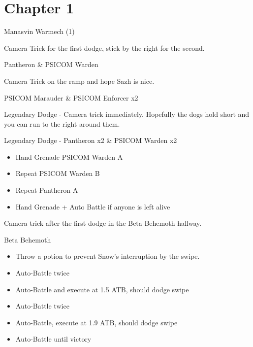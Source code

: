 \chapter{Chapter 1}
	\begin{battle}[1:06]{Manasvin Warmech (1)}
	\end{battle}

	Camera Trick for the first dodge, stick by the right for the second.

	\begin{battle}[0:16]{Pantheron \& PSICOM Warden}
	\end{battle}

	Camera Trick on the ramp and hope Sazh is nice.

	\begin{battle}[0:39]{PSICOM Marauder \& PSICOM Enforcer x2}
	\end{battle}

	Legendary Dodge - Camera trick immediately. Hopefully the dogs hold short and you can run to the right around them.

	\begin{battle}[0:18]{Legendary Dodge - Pantheron x2 \& PSICOM Warden x2}
		\begin{itemize}
			\item Hand Grenade PSICOM Warden A
			\item Repeat PSICOM Warden B
			\item Repeat Pantheron A
			\item Hand Grenade + Auto Battle if anyone is left alive
		\end{itemize}

	\end{battle}

	Camera trick after the first dodge in the Beta Behemoth hallway.

	\begin{battle}[0:51]{Beta Behemoth}
		\begin{itemize}
			\item Throw a potion to prevent Snow's interruption by the swipe.
			\item Auto-Battle twice
			\item Auto-Battle and execute at 1.5 ATB, should dodge swipe
			\item Auto-Battle twice
			\item Auto-Battle, execute at 1.9 ATB, should dodge swipe
			\item Auto-Battle until victory
		\end{itemize}
	\end{battle}

